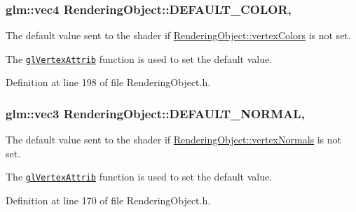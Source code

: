\subsubsection[{D\+E\+F\+A\+U\+L\+T\+\_\+\+C\+O\+L\+O\+R}]{\setlength{\rightskip}{0pt plus 5cm}glm\+::vec4 Rendering\+Object\+::\+D\+E\+F\+A\+U\+L\+T\+\_\+\+C\+O\+L\+O\+R\hspace{0.3cm}{\ttfamily [static]}, {\ttfamily [protected]}}\label{class_rendering_object_a3bf21996dc0ef604b2b81d95275c97f9}


The default value sent to the shader if \hyperlink{class_rendering_object_a65fc52e665791ce55e43106b603e917a}{Rendering\+Object\+::vertex\+Colors} is not set. 

The \href{https://www.opengl.org/sdk/docs/man/html/glVertexAttrib.xhtml}{\tt gl\+Vertex\+Attrib} function is used to set the default value. 

Definition at line 198 of file Rendering\+Object.\+h.

\hypertarget{class_rendering_object_af270a476ba12c23fefbb034e21930add}{}
\subsubsection[{D\+E\+F\+A\+U\+L\+T\+\_\+\+N\+O\+R\+M\+A\+L}]{\setlength{\rightskip}{0pt plus 5cm}glm\+::vec3 Rendering\+Object\+::\+D\+E\+F\+A\+U\+L\+T\+\_\+\+N\+O\+R\+M\+A\+L\hspace{0.3cm}{\ttfamily [static]}, {\ttfamily [protected]}}\label{class_rendering_object_af270a476ba12c23fefbb034e21930add}


The default value sent to the shader if \hyperlink{class_rendering_object_ac28d301f97d29ab603f65f8e823063b4}{Rendering\+Object\+::vertex\+Normals} is not set. 

The \href{https://www.opengl.org/sdk/docs/man/html/glVertexAttrib.xhtml}{\tt gl\+Vertex\+Attrib} function is used to set the default value. 

Definition at line 170 of file Rendering\+Object.\+h.

\hypertarget{class_rendering_object_a3dcb28a12f578630aea75cc59ea39588}{}
